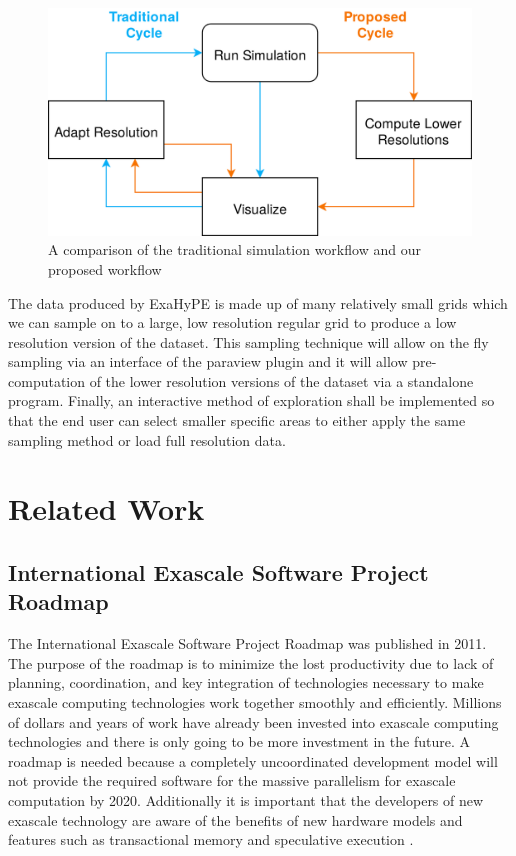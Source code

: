 \documentclass[12pt,a4paper]{article}
\begin{document}
\begin{figure}[h]
\centering
\includegraphics[scale=0.2]{vis-workflow}
\caption{A comparison of the traditional simulation workflow and our proposed workflow}
\label{workflows}
\end{figure}

The data produced by ExaHyPE is made up of many relatively small grids which we can sample on to a large, low resolution regular grid to produce a low resolution version of the dataset. This sampling technique will allow on the fly sampling via an interface of the paraview plugin and it will allow pre-computation of the lower resolution versions of the dataset via a standalone program. Finally, an interactive method of exploration shall be implemented so that the end user can select smaller specific areas to either apply the same sampling method or load full resolution data.

\section{Related Work}

\subsection{International Exascale Software Project Roadmap}
The International Exascale Software Project Roadmap \cite{Dongarra} was published in 2011. The purpose of the roadmap is to minimize the lost productivity due to lack of planning, coordination, and key integration of technologies necessary to make exascale computing technologies work together smoothly and efficiently. Millions of dollars and years of work have already been invested into exascale computing technologies and there is only going to be more investment in the future. A roadmap is needed because a completely uncoordinated development model will not provide the required software for the massive parallelism for exascale computation by 2020. Additionally it is important that the developers of new exascale technology are aware of the benefits of new hardware models and features such as transactional memory \cite{TransMemory} and speculative execution \cite{ValuePredictionTechniques}.
\end{document}

